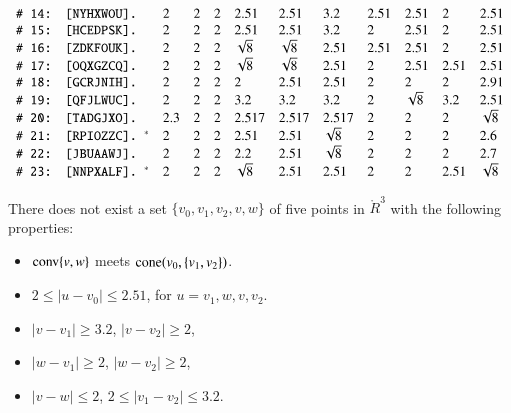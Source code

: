 \begin{lemma}
$$\begin{array}{llllllllllll}
%
 \rr{14}&\tuid{NYHXWOU}\tlabel{tarski:E:part4:6}
   &2 &2 &2 &2.51& 2.51 &3.2& 2.51 & 2.51 & 2 & 2.51\\
%
 \rr{15}&\tuid{HCEDPSK}\tlabel{tarski:E:part4:7}
   &2 &2 &2 &2.51& 2.51 &3.2& 2 & 2.51 & 2 & 2.51\\
%
 \rr{16}&\tuid{ZDKFOUK}\tlabel{tarski:E:part4:8}
   &2 &2 &2 &\sqrt{8}& \sqrt{8} &2.51& 2.51 & 2.51 & 2 &  2.51\\
%
 \rr{17}&\tuid{OQXGZCQ}\tlabel{tarski:E:part4:9}
   &2 &2 &2 &\sqrt{8}& \sqrt{8} &2.51& 2 & 2.51 & 2.51 &  2.51\\
%
 \rr{18}&\tuid{GCRJNIH}\tlabel{tarski:E:part4:10}
   &2 &2 &2 &  2& 2.51 &2.51&   2 & 2 & 2 &  2.91\\
%
 \rr{19}&\tuid{QFJLWUC}\tlabel{tarski:dcg-p142}
   &2 &2 &2 &   3.2& 3.2 &3.2&   2 & \sqrt8 & 3.2 &  2.51\\
%
 \rr{20}&\tuid{TADGJXO}\tlabel{tarski:convex-quad}
   &2.3 &2 &2 &   2.517& 2.517 &2.517&  2 & 2 & 2 &  \sqrt8\\
 \rr{21}&\tuid{RPIOZZC}\tlabel{tarski:last:E}\usage{DCG-[11.22]{ remark:2.6}}
   &2 &2 &2 &  2.51& 2.51 &\sqrt8&  2 & 2 & 2 & 2.6\\
%
 \rr{22}&\tuid{JBUAAWJ} \tlabel{tarski:rem2.7}
     &2 &2 &2 &2.2& 2.51 &\sqrt{8}& 2 & 2 & 2 & 2.7\\
%
 \rr{23}&\tuid{NNPXALF} \tlabel{tarski:pass-anchor}\usage{DCG-[4.24]{ lemma:pass-anchor}}
     &2&2&2&\sqrt8 &2.51 &2.51 &2 &2 &2.51&\sqrt8\\
\end{array}$$
\end{lemma}
 


\newpage



\begin{lemma}
  There does not exist a set $\{v_0,v_1,v_2,v,w\}$ of five points
in $\ring{R}^3$ with the following properties:
\begin{itemize}
  \item ${\operatorname{conv}}\{v,w\}$ meets ${\operatorname{cone}}(v_0,\{v_1,v_2\})$.
  \item $2\le |u-v_0| \le 2.51$, for $u=v_1,w,v,v_2$.
    \item $|v-v_1|\ge 3.2$,  $|v-v_2|\ge 2$,
    \item $|w-v_1|\ge2$, $|w-v_2|\ge2$,
    \item   $|v-w|\le2$, $2\le |v_1-v_2|\le 3.2$.
\end{itemize}
\end{lemma}

